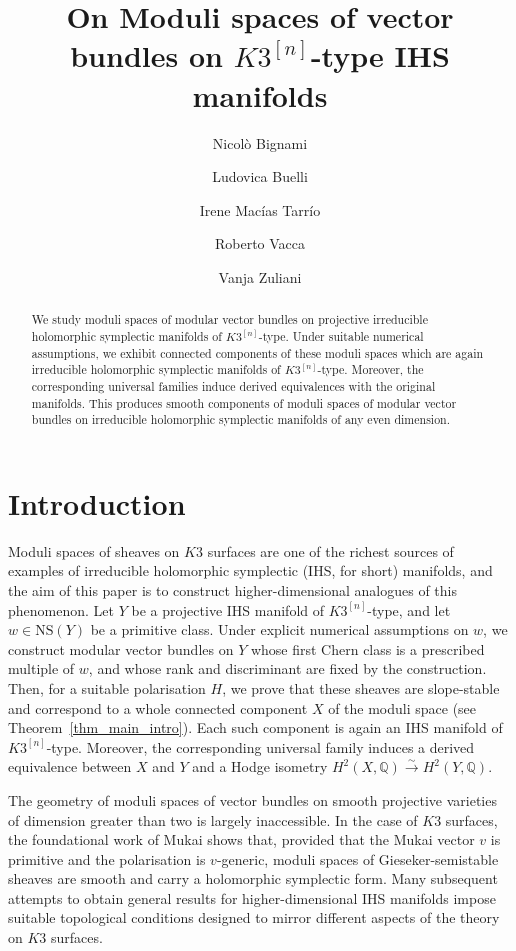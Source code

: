 \documentclass[12pt,a4paper]{amsart}
\author[N.~Bignami]{Nicol\`o Bignami}
\author[L.~Buelli]{Ludovica Buelli}
\author[I.~Mac\'ias Tarr\'io]{Irene Mac\'ias Tarr\'io}
\author[R.~Vacca]{Roberto Vacca}
\author[V.~Zuliani]{Vanja Zuliani}
\title{On Moduli spaces of vector bundles on $K3^{[n]}$-type IHS manifolds}
\theoremstyle{plain}
\theoremstyle{definition}
\theoremstyle{remark}
\def\H{H}
\newcommand{\NS}{\mathrm{NS}}
\begin{document}
\begin{abstract}
We study moduli spaces of modular vector bundles on projective irreducible holomorphic symplectic manifolds of $K3^{[n]}$-type. Under suitable numerical assumptions, we exhibit connected components of these moduli spaces which are again irreducible holomorphic symplectic manifolds of $K3^{[n]}$-type. Moreover, the corresponding  universal families induce derived equivalences with the original manifolds.
This produces smooth components of moduli spaces of modular vector bundles on irreducible holomorphic symplectic manifolds of any even dimension.
\end{abstract}
\maketitle
{\hypersetup{linkcolor=black}\tableofcontents}
\section*{Introduction}

Moduli spaces of sheaves on $K3$ surfaces are one of the richest sources of examples of irreducible holomorphic symplectic (IHS, for short) manifolds, and the aim of this paper is to construct higher-dimensional analogues of this phenomenon. 
Let $Y$ be a projective IHS manifold of $K3^{[n]}$-type, and let $w\in \NS(Y)$ be a primitive class. Under explicit numerical assumptions on $w$, we construct modular vector bundles on $Y$ whose first Chern class is a prescribed multiple of $w$, and whose rank and discriminant are fixed by the construction. Then, for a suitable polarisation $H$, we prove that these sheaves are slope-stable and correspond to a whole connected component $X$ of the moduli space (see Theorem~\ref{thm_main_intro}). Each such component is again an IHS manifold of $K3^{[n]}$-type. Moreover, the corresponding  universal family induces a  derived equivalence between $X$ and $Y$ and a Hodge isometry $\H^2(X,\mathbb{Q})\xrightarrow{\sim} \H^2(Y,\mathbb{Q})$.

The geometry of moduli spaces of vector bundles on smooth projective varieties of dimension greater than two is largely inaccessible. In the case of $K3$ surfaces, the foundational work of Mukai \cite{Mukai1} shows that, provided that the Mukai vector $v$ is primitive and the polarisation is $v$-generic, moduli spaces of Gieseker-semistable sheaves are smooth and carry a holomorphic symplectic form. Many subsequent attempts to obtain general results for higher-dimensional IHS manifolds impose suitable topological conditions designed to mirror different aspects of the theory on $K3$ surfaces.
\end{document}
